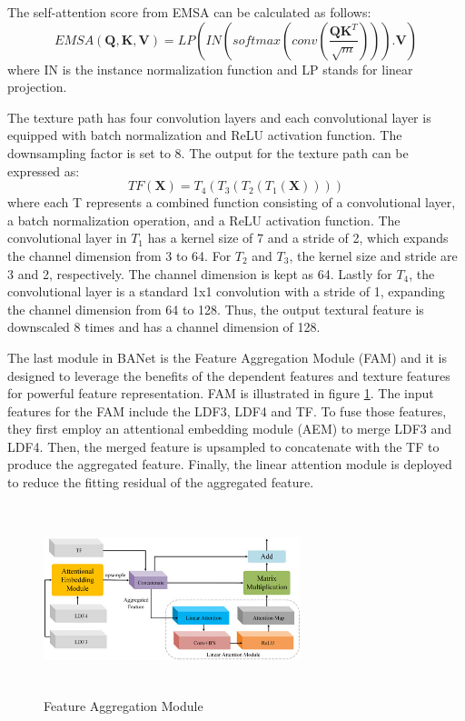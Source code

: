 The self-attention score from EMSA can be calculated as follows:
\begin{equation}
    EMSA(\mathbf{Q,K,V}) = LP(IN(softmax(conv(\frac{\mathbf{QK}^T}{\sqrt{m}}))).\mathbf{V})
\end{equation}
where IN is the instance normalization function and LP stands for linear projection.

The texture path has four convolution layers and each convolutional layer is equipped with batch normalization and ReLU activation function. The downsampling factor is set to 8. The output for the texture path can be expressed as:
\begin{equation}
    TF(\mathbf{X}) = T_4(T_3(T_2(T_1(\mathbf{X}))))
\end{equation}
where each T represents a combined function consisting of a convolutional layer, a batch
normalization operation, and a ReLU activation function. The convolutional layer in $T_1$ has a
kernel size of 7 and a stride of 2, which expands the channel dimension from 3 to 64. For
$T_2$ and $T_3$, the kernel size and stride are 3 and 2, respectively. The channel dimension is
kept as 64. Lastly for $T_4$, the convolutional layer is a standard 1x1 convolution with a stride of 1, expanding the channel dimension from 64 to 128. Thus, the output textural feature is
downscaled 8 times and has a channel dimension of 128.

The last module in BANet is the Feature Aggregation Module (FAM) and it is designed to leverage the benefits of the dependent features and texture features for powerful feature representation. FAM is illustrated in figure \ref{fig:fam}. The input features for the FAM include the LDF3, LDF4 and TF. To fuse those features, they first employ an attentional embedding module (AEM) to merge LDF3 and LDF4. Then, the merged feature is upsampled to concatenate with the TF to produce the aggregated feature. Finally, the linear attention module is deployed to reduce the fitting residual of the aggregated feature.

\FloatBarrier
\begin{figure}[ht]
\includegraphics[width=7.5cm, height=5.5cm]{images/fam.jpg}
\centering
\caption{Feature Aggregation Module}
\label{fig:fam}
\end{figure}

